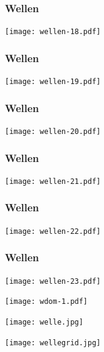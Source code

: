 \documentclass[handout]{beamer}
\begin{document}
\begin{frame}
\frametitle{Wellen}
\begin{center}
\texttt{[image: wellen-18.pdf]}
\end{center}
\end{frame}

\begin{frame}
\frametitle{Wellen}
\begin{center}
\texttt{[image: wellen-19.pdf]}
\end{center}
\end{frame}

\begin{frame}
\frametitle{Wellen}
\begin{center}
\texttt{[image: wellen-20.pdf]}
\end{center}
\end{frame}

\begin{frame}
\frametitle{Wellen}
\begin{center}
\texttt{[image: wellen-21.pdf]}
\end{center}
\end{frame}

\begin{frame}
\frametitle{Wellen}
\begin{center}
\texttt{[image: wellen-22.pdf]}
\end{center}
\end{frame}

\begin{frame}
\frametitle{Wellen}
\begin{center}
\texttt{[image: wellen-23.pdf]}
\end{center}
\end{frame}

\begin{frame}
\begin{center}
\texttt{[image: wdom-1.pdf]}
\end{center}
\end{frame}

\begin{frame}
\begin{center}
\texttt{[image: welle.jpg]}
\end{center}
\end{frame}

\begin{frame}
\begin{center}
\texttt{[image: wellegrid.jpg]}
\end{center}
\end{frame}
\end{document}
